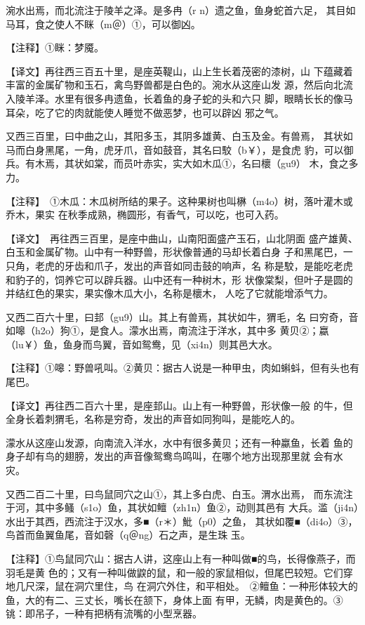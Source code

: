 \documentclass[a4paper,12pt,UTF8,twoside]{ctexbook}
\begin{document}
涴水出焉，而北流注于陵羊之泽。是多冉（r n）遗之鱼，鱼身蛇首六足， 其目如马耳，食之使人不眯（m＠）①，可以御凶。

【注释】①眯：梦魇。

【译文】再往西三百五十里，是座英鞮山，山上生长着茂密的漆树，山 下蕴藏着丰富的金属矿物和玉石，禽鸟野兽都是白色的。涴水从这座山发 源，然后向北流入陵羊泽。水里有很多冉遗鱼，长着鱼的身子蛇的头和六只 脚，眼睛长长的像马耳朵，吃了它的肉就能使人睡觉不做恶梦，也可以辟凶 邪之气。

又西三百里，曰中曲之山，其阳多玉，其阴多雄黄、白玉及金。有兽焉， 其状如马而白身黑尾，一角，虎牙爪，音如鼓音，其名曰駮（b￥），是食虎 豹，可以御兵。有木焉，其状如棠，而员叶赤实，实大如木瓜①，名曰櫰（gu9） 木，食之多力。

【注释】　①木瓜：木瓜树所结的果子。这种果树也叫楙（m4o）树，落叶灌木或乔木，果实 在秋季成熟，椭圆形，有香气，可以吃，也可入药。

【译文】　再往西三百里，是座中曲山，山南阳面盛产玉石，山北阴面 盛产雄黄、白玉和金属矿物。山中有一种野兽，形状像普通的马却长着白身 子和黑尾巴，一只角，老虎的牙齿和爪子，发出的声音如同击鼓的响声，名 称是駮，是能吃老虎和豹子的，饲养它可以辟兵器。山中还有一种树木，形 状像棠梨，但叶子是圆的并结红色的果实，果实像木瓜大小，名称是櫰木， 人吃了它就能增添气力。

又西二百六十里，曰邽（gu9）山。其上有兽焉，其状如牛，猬毛，名 曰穷奇，音如嗥（h2o）狗①，是食人。濛水出焉，南流注于洋水，其中多 黄贝②；蠃（lu￥）鱼，鱼身而鸟翼，音如鸳鸯，见（xi4n）则其邑大水。

【注释】①嗥：野兽吼叫。②黄贝：据古人说是一种甲虫，肉如蝌蚪，但有头也有尾巴。

【译文】再往西二百六十里，是座邽山。山上有一种野兽，形状像一般 的牛，但全身长着刺猬毛，名称是穷奇，发出的声音如同狗叫，是能吃人的。

濛水从这座山发源，向南流入洋水，水中有很多黄贝；还有一种蠃鱼，长着 鱼的身子却有鸟的翅膀，发出的声音像鸳鸯鸟鸣叫，在哪个地方出现那里就 会有水灾。

又西二百二十里，曰鸟鼠同穴之山①，其上多白虎、白玉。渭水出焉， 而东流注于河，其中多鳋（s1o）鱼，其状如鳣（zh1n）鱼②，动则其邑有 大兵。滥（ji4n）水出于其西，西流注于汉水，多■（r＊）魮（p0）之鱼， 其状如覆■（di4o）③，鸟首而鱼翼鱼尾，音如磬（q＠ng）石之声，是生珠 玉。

【注释】①鸟鼠同穴山：据古人讲，这座山上有一种叫做■的鸟，长得像燕子，而羽毛是黄 色的；又有一种叫做鼵的鼠，和一般的家鼠相似，但尾巴较短。它们穿地几尺深，鼠在洞穴里住，鸟 在洞穴外住，和平相处。　②鳣鱼：一种形体较大的鱼，大的有二、三丈长，嘴长在颔下，身体上面 有甲，无鳞，肉是黄色的。③铫：即吊子，一种有把柄有流嘴的小型烹器。
\end{document}

